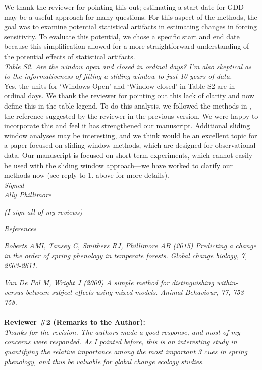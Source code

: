 \documentclass{article}
\begin{document}
We thank the reviewer for pointing this out; estimating a start date for GDD \citep[as done in][]{roberts2015} may be a useful approach for many questions. For this aspect of the methods, the goal was to examine potential statistical artifacts in estimating changes in forcing sensitivity. To evaluate this potential, we chose a specific start and end date because this simplification allowed for a more straightforward understanding of the potential effects of statistical artifacts.\\

 \emph{Table S2. Are the window open and closed in ordinal days? I'm also skeptical as to the informativeness of fitting a sliding window to just 10 years of data.}\\

Yes, the units for `Windows Open' and `Window closed' in Table S2 are in ordinal days. We thank the reviewer for pointing out this lack of clarity and now define this in the table legend. To do this analysis, we followed the methods in \citet{simmonds2019}, the reference suggested by the reviewer in the previous version. We were happy to incorporate this and feel it has strengthened our manuscript. Additional sliding window analyses may be interesting, and we think would be an excellent topic for a paper focused on sliding-window methods, which are designed for observational data. Our manuscript is focused on short-term experiments, which cannot easily be used with the sliding window approach---we have worked to clarify our methods now (see reply to 1. above for more details).\\

 \emph{Signed}\\
 \emph{Ally Phillimore}

 \emph{(I sign all of my reviews)}

 \emph{References}

\emph{Roberts AMI, Tansey C, Smithers RJ, Phillimore AB (2015) Predicting a change in the order of spring
phenology in temperate forests. Global change biology, 7, 2603-2611.}

 \emph{Van De Pol M, Wright J (2009) A simple method for distinguishing within- versus between-subject effects
using mixed models. Animal Behaviour, 77, 753-758.}\\
\\ 

{\bf Reviewer \#2 (Remarks to the Author):}\\

\emph{Thanks for the revision. The authors made a good response, and most of my concerns were responded. As I pointed before, this is an interesting study in quantifying the relative importance among the most important 3 cues in spring phenology, and thus be valuable for global change ecology studies. }\\
\end{document}
